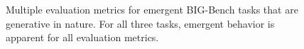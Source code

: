 \begin{figure}[ht]
\begin{centering}
    \caption{
    Multiple evaluation metrics for emergent BIG-Bench tasks that are generative in nature. 
    For all three tasks, emergent behavior is apparent for all evaluation metrics.
    } 
    \label{fig:intrinsic-emergent-metrics}
    \end{centering}
\end{figure}